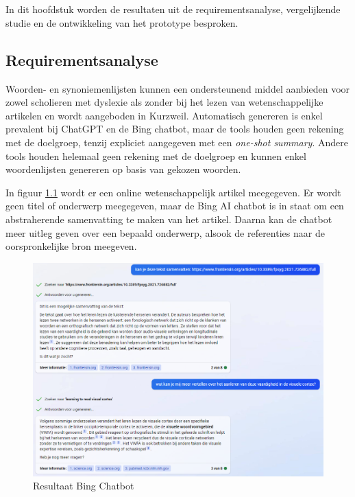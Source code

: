 \chapter{}%
\label{ch:resultaten}

In dit hoofdstuk worden de resultaten uit de requirementsanalyse, vergelijkende studie en de ontwikkeling van het prototype besproken. 

\section{Requirementsanalyse}

Woorden- en synoniemenlijsten kunnen een ondersteunend middel aanbieden voor zowel scholieren met dyslexie als zonder bij het lezen van wetenschappelijke artikelen en wordt aangeboden in Kurzweil. Automatisch genereren is enkel prevalent bij ChatGPT en de Bing chatbot, maar de tools houden geen rekening met de doelgroep, tenzij expliciet aangegeven met een \textit{one-shot summary}. Andere tools houden helemaal geen rekening met de doelgroep en kunnen enkel woordenlijsten genereren op basis van gekozen woorden.

\medspace

In figuur \ref{img:tryout-bing-ai} wordt er een online wetenschappelijk artikel meegegeven. Er wordt geen titel of onderwerp meegegeven, maar de Bing AI chatbot is in staat om een abstraherende samenvatting te maken van het artikel. Daarna kan de chatbot meer uitleg geven over een bepaald onderwerp, alsook de referenties naar de oorspronkelijke bron meegeven. 

\begin{figure}[H]
	\includegraphics{img/bing-ai-chatbot-example.png}
	\caption{Resultaat Bing Chatbot}
	\label{img:tryout-bing-ai}
\end{figure}

